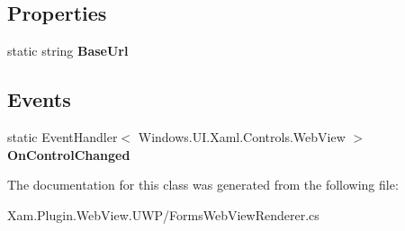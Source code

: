 \subsection*{Properties}
\begin{DoxyCompactItemize}
\item 
\mbox{\label{class_xam_1_1_plugin_1_1_web_view_1_1_u_w_p_1_1_forms_web_view_renderer_a6d300a6bf975719de0b1f88108299c38}} 
static string {\bfseries Base\+Url}
\end{DoxyCompactItemize}
\subsection*{Events}
\begin{DoxyCompactItemize}
\item 
\mbox{\label{class_xam_1_1_plugin_1_1_web_view_1_1_u_w_p_1_1_forms_web_view_renderer_a84a5da16429036f386ed5d7ab145fb4b}} 
static Event\+Handler$<$ Windows.\+U\+I.\+Xaml.\+Controls.\+Web\+View $>$ {\bfseries On\+Control\+Changed}
\end{DoxyCompactItemize}


The documentation for this class was generated from the following file\+:\begin{DoxyCompactItemize}
\item 
Xam.\+Plugin.\+Web\+View.\+U\+W\+P/Forms\+Web\+View\+Renderer.\+cs\end{DoxyCompactItemize}
